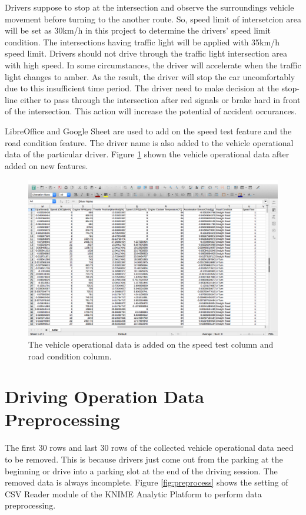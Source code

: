 Drivers suppose to stop at the intersection and observe the surroundings vehicle movement before turning to the another route. So, speed limit of intersetcion area will be set as 30km/h in this project to determine the drivers' speed limit condition. The intersections having traffic light will be applied with 35km/h speed limit. Drivers should not drive through the traffic light intersection area with high speed. In some circumstances, the driver will accelerate when the traffic light changes to amber. As the result, the driver will stop the car uncomfortably due to this insufficient time period. The driver need to make decision at the stop-line either to pass through the intersection after red signals or brake hard in front of the intersection. This action will increase the potential of accident occurances.\cite{kulanthayan:phang:hayati:2007}

LibreOffice and Google Sheet are used to add on the speed test feature and the road condition feature. The driver name is also added to the vehicle operational data of the particular driver. Figure \ref{fig:speedtest} shown the vehicle operational data after added on new features.

\begin{figure}[hbt!]\centering
\includegraphics[width=.75\textwidth]{image/LOspeedtest}
\caption{The vehicle operational data is added on the speed test column and road condition column.}
\label{fig:speedtest}
\end{figure}


\section{Driving Operation Data Preprocessing}
The first 30 rows and last 30 rows of the collected vehicle operational data need to be removed. This is because drivers just come out from the parking at the beginning or drive into a parking slot at the end of the driving session. The removed data is always incomplete. Figure \ref{fig:preprocess} shows the setting of CSV Reader module of the KNIME Analytic Platform to perform data preprocessing.

